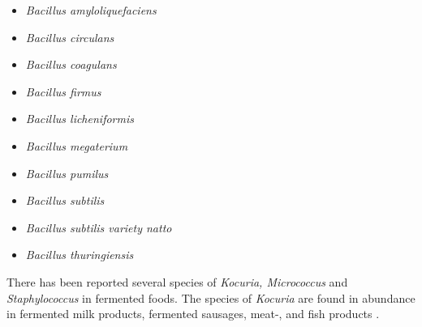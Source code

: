 \begin{highlight}
    \begin{multicols}{3}
        \begin{itemize}
            \item \textit{Bacillus amyloliquefaciens}
            \item \textit{Bacillus circulans}
            \item \textit{Bacillus coagulans}
            \item \textit{Bacillus firmus}
            \item \textit{Bacillus licheniformis}
            \item \textit{Bacillus megaterium}
            \item \textit{Bacillus pumilus}
            \item \textit{Bacillus subtilis}
            \item \textit{Bacillus subtilis variety natto}
            \item \textit{Bacillus thuringiensis}            
        \end{itemize}
    \end{multicols}
\end{highlight}

There has been reported several species of \textit{Kocuria, Micrococcus} and \textit{Staphylococcus} in fermented foods. The species of \textit{Kocuria} are found in abundance in fermented milk products, fermented sausages, meat-, and fish products \cite*{L1-DiversityMicro}.

\vspace{1em}

